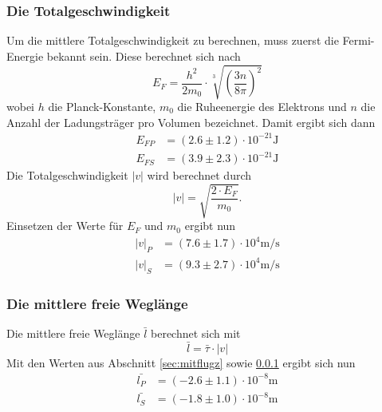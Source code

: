     \subsubsection{Die Totalgeschwindigkeit}
    \label{sec:totgeschw}
      Um die mittlere Totalgeschwindigkeit zu berechnen, muss zuerst die Fermi-Energie bekannt sein. Diese berechnet sich nach
      \begin{equation}
        E_{F} = \frac{h^{2}}{2m_{0}} \cdot \sqrt[3]{\left(\frac{3n}{8 \pi}\right)^{2}}
      \end{equation}
      wobei $h$ die Planck-Konstante, $m_{0}$ die Ruheenergie des Elektrons und $n$ die Anzahl der Ladungsträger pro Volumen bezeichnet. Damit ergibt sich dann
      \begin{align*}
        E_{FP} & = (2.6 \pm 1.2) \cdot 10^{-21} \si{\joule} \\
        E_{FS} & = (3.9 \pm 2.3) \cdot 10^{-21} \si{\joule}
      \end{align*}
      Die Totalgeschwindigkeit $|v|$ wird berechnet durch
      \begin{equation}
        |v| = \sqrt{\frac{2 \cdot E_{F}}{m_{0}}}.
      \end{equation}
      Einsetzen der Werte für $E_{F}$ und $m_{0}$ ergibt nun
      \begin{align*}
        |v|_{P} & = (7.6 \pm 1.7)\cdot 10^{4} \si{\meter\per\second}\\
        |v|_{S} & = (9.3 \pm 2.7)\cdot 10^{4} \si{\meter\per\second}
      \end{align*}
    \subsubsection{Die mittlere freie Weglänge}
      Die mittlere freie Weglänge $\bar{l}$ berechnet sich mit
      \begin{equation}
        \bar{l} = \bar{\tau} \cdot |v|
      \end{equation}
      Mit den Werten aus Abschnitt \ref{sec:mitflugz} sowie \ref{sec:totgeschw} ergibt sich nun
      \begin{align*}
        \bar{l_{P}} & = (-2.6 \pm 1.1)\cdot 10^{-8}  \si{\meter} \\
        \bar{l_{S}} & = (-1.8 \pm 1.0)\cdot 10^{-8}  \si{\meter}
      \end{align*}
